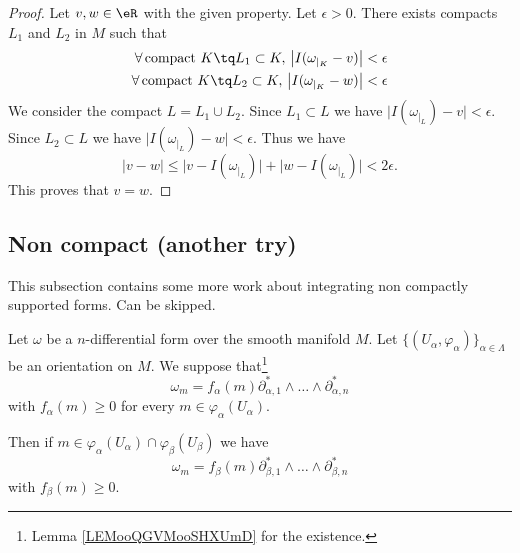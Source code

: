 \begin{proof}
	Let \( v,w\in \eR\) with the given property. Let \( \epsilon>0\). There exists compacts \( L_1\) and \( L_2\) in \( M\) such that
	\begin{subequations}
		\begin{align}
			\forall\, \text{compact } K\tq L_1\subset K,\,\big|   I(\omega_{|_K}-v) \big|<\epsilon \\
			\forall\, \text{compact } K\tq L_2\subset K,\,\big|   I(\omega_{|_K}-w) \big|<\epsilon
		\end{align}
	\end{subequations}
	We consider the compact \( L=L_1\cup L_2\). Since \( L_1\subset L\) we have \( \big|  I(\omega_{|_L})-v  \big|<\epsilon\). Since \( L_2\subset L\) we have \( \big|  I(\omega_{|_L})-w  \big|<\epsilon\). Thus we have
	\begin{equation}
		| v-w |  \leq \big|  v-I(\omega_{|_L}) \big| +\big|  w-I(\omega_{|_L}) \big| <2\epsilon.
	\end{equation}
	This proves that \( v=w\).
\end{proof}

\subsection{Non compact (another try)}

This subsection contains some more work about integrating non compactly supported forms. Can be skipped.


\begin{lemma}	\label{LEMooEKYAooERjAnc}
	Let \( \omega\) be a \( n\)-differential form over the smooth manifold \( M\). Let \( \{ (U_{\alpha},\varphi_{\alpha}) \}_{\alpha\in \Lambda}\) be an orientation on \( M\). We suppose that\footnote{Lemma \ref{LEMooQGVMooSHXUmD} for the existence.}
	\begin{equation}
		\omega_m=f_{\alpha}(m)\partial_{\alpha,1}^*\wedge\ldots\wedge\partial_{\alpha,n}^*
	\end{equation}
	with \( f_{\alpha}(m)\geq 0\) for every \( m\in \varphi_{\alpha}(U_{\alpha})\).

	Then if \( m\in \varphi_{\alpha}(U_{\alpha})\cap \varphi_{\beta}(U_{\beta})\) we have
	\begin{equation}
		\omega_m=f_{\beta}(m)\partial_{\beta,1}^*\wedge\ldots\wedge\partial_{\beta,n}^*
	\end{equation}
	with \( f_{\beta}(m)\geq 0\).
\end{lemma}

